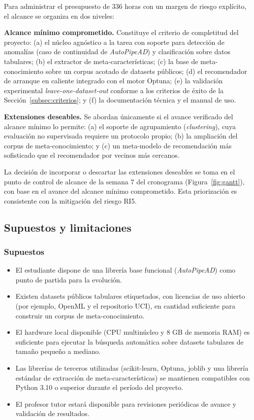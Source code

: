 \documentclass[12pt,letterpaper]{article}
\begin{document}
Para administrar el presupuesto de 336 horas con un margen de riesgo explícito, el alcance se organiza en dos niveles:

\textbf{Alcance mínimo comprometido.} Constituye el criterio de completitud del proyecto: (a) el núcleo agnóstico a la tarea con soporte para detección de anomalías (caso de continuidad de \textit{AutoPipeAD}) y clasificación sobre datos tabulares; (b) el extractor de meta-características; (c) la base de meta-conocimiento sobre un corpus acotado de datasets públicos; (d) el recomendador de arranque en caliente integrado con el motor Optuna; (e) la validación experimental \textit{leave-one-dataset-out} conforme a los criterios de éxito de la Sección~\ref{subsec:criterios}; y (f) la documentación técnica y el manual de uso.

\textbf{Extensiones deseables.} Se abordan únicamente si el avance verificado del alcance mínimo lo permite: (a) el soporte de agrupamiento (\textit{clustering}), cuya evaluación no supervisada requiere un protocolo propio; (b) la ampliación del corpus de meta-conocimiento; y (c) un meta-modelo de recomendación más sofisticado que el recomendador por vecinos más cercanos.

La decisión de incorporar o descartar las extensiones deseables se toma en el punto de control de alcance de la semana 7 del cronograma (Figura~\ref{fig:gantt}), con base en el avance del alcance mínimo comprometido. Esta priorización es consistente con la mitigación del riesgo RI5.

\subsection{Supuestos y limitaciones}

\subsubsection{Supuestos}

\begin{itemize}
  \item El estudiante dispone de una librería base funcional (\textit{AutoPipeAD}) como punto de partida para la evolución.
  \item Existen datasets públicos tabulares etiquetados, con licencias de uso abierto (por ejemplo, OpenML y el repositorio UCI), en cantidad suficiente para construir un corpus de meta-conocimiento.
  \item El hardware local disponible (CPU multinúcleo y 8 GB de memoria RAM) es suficiente para ejecutar la búsqueda automática sobre datasets tabulares de tamaño pequeño a mediano.
  \item Las librerías de terceros utilizadas (scikit-learn, Optuna, joblib y una librería estándar de extracción de meta-características) se mantienen compatibles con Python 3.10 o superior durante el período del proyecto.
  \item El profesor tutor estará disponible para revisiones periódicas de avance y validación de resultados.
\end{itemize}
\end{document}
